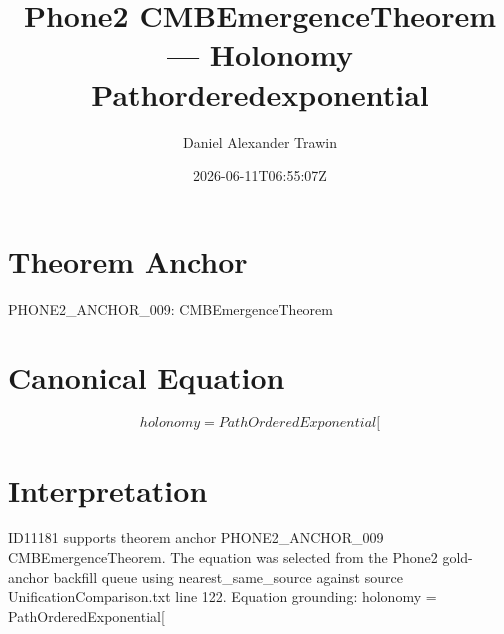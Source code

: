 \documentclass[11pt]{article}
\title{Phone2 CMBEmergenceTheorem — Holonomy Pathorderedexponential}
\author{Daniel Alexander Trawin}
\date{2026-06-11T06:55:07Z}
\begin{document}
\maketitle
\section*{Theorem Anchor}
PHONE2_ANCHOR_009: CMBEmergenceTheorem
\section*{Canonical Equation}
\[
holonomy = PathOrderedExponential[
\]
\section*{Interpretation}
ID11181 supports theorem anchor PHONE2_ANCHOR_009 CMBEmergenceTheorem. The equation was selected from the Phone2 gold-anchor backfill queue using nearest_same_source against source UnificationComparison.txt line 122. Equation grounding: holonomy = PathOrderedExponential[
\end{document}
